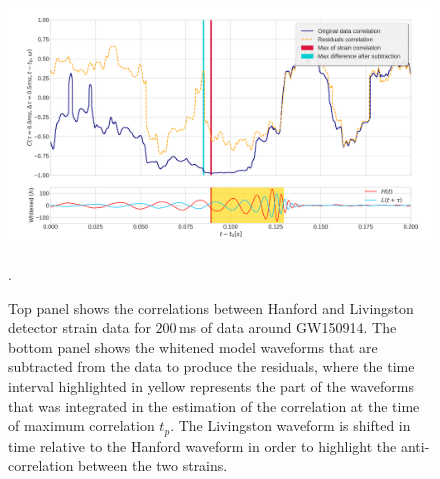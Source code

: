 \documentclass[a4paper,11pt]{article}
\begin{document}
\begin{figure}[tb]
  \centering
  \includegraphics[width=\columnwidth]{GW150914CorrVsTime.png}
\caption{Top panel shows the correlations between Hanford and Livingston detector strain data for $200$\,ms of data around GW150914. The bottom panel shows the whitened model waveforms that are subtracted from the data to produce the residuals, where the time interval highlighted in yellow represents the part of the waveforms that was integrated in the estimation of the correlation at the time of maximum correlation $t_p$. The Livingston waveform is shifted in time relative to the Hanford waveform in order to highlight the anti-correlation between the two strains.}. 
\label{fig:150914corr}
\end{figure}
\end{document}
